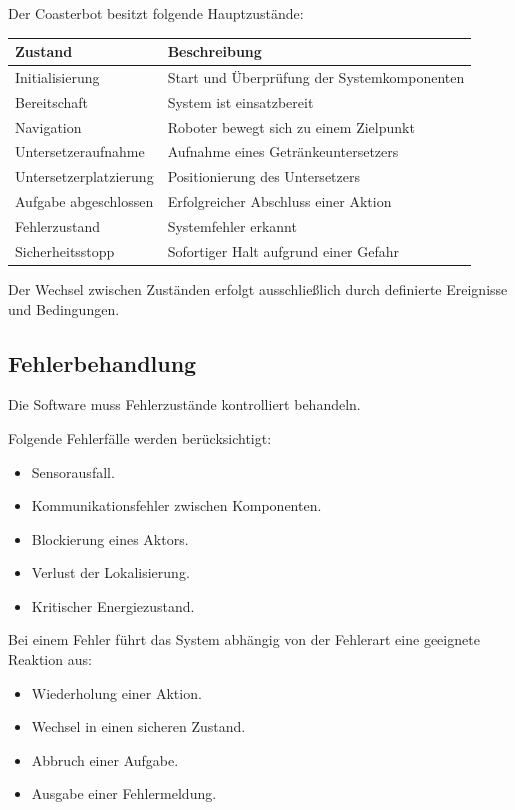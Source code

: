 Der Coasterbot besitzt folgende Hauptzustände:

\begin{longtable}[]{@{}ll@{}}
\toprule\noalign{}
Zustand & Beschreibung \\
\midrule\noalign{}
\endhead
\bottomrule\noalign{}
\endlastfoot
Initialisierung & Start und Überprüfung der Systemkomponenten \\
Bereitschaft & System ist einsatzbereit \\
Navigation & Roboter bewegt sich zu einem Zielpunkt \\
Untersetzeraufnahme & Aufnahme eines Getränkeuntersetzers \\
Untersetzerplatzierung & Positionierung des Untersetzers \\
Aufgabe abgeschlossen & Erfolgreicher Abschluss einer Aktion \\
Fehlerzustand & Systemfehler erkannt \\
Sicherheitsstopp & Sofortiger Halt aufgrund einer Gefahr \\
\end{longtable}

Der Wechsel zwischen Zuständen erfolgt ausschließlich durch definierte
Ereignisse und Bedingungen.

\subsection{Fehlerbehandlung}\label{fehlerbehandlung}

Die Software muss Fehlerzustände kontrolliert behandeln.

Folgende Fehlerfälle werden berücksichtigt:

\begin{itemize}
\tightlist
\item
  Sensorausfall.
\item
  Kommunikationsfehler zwischen Komponenten.
\item
  Blockierung eines Aktors.
\item
  Verlust der Lokalisierung.
\item
  Kritischer Energiezustand.
\end{itemize}

Bei einem Fehler führt das System abhängig von der Fehlerart eine
geeignete Reaktion aus:

\begin{itemize}
\tightlist
\item
  Wiederholung einer Aktion.
\item
  Wechsel in einen sicheren Zustand.
\item
  Abbruch einer Aufgabe.
\item
  Ausgabe einer Fehlermeldung.
\end{itemize}

